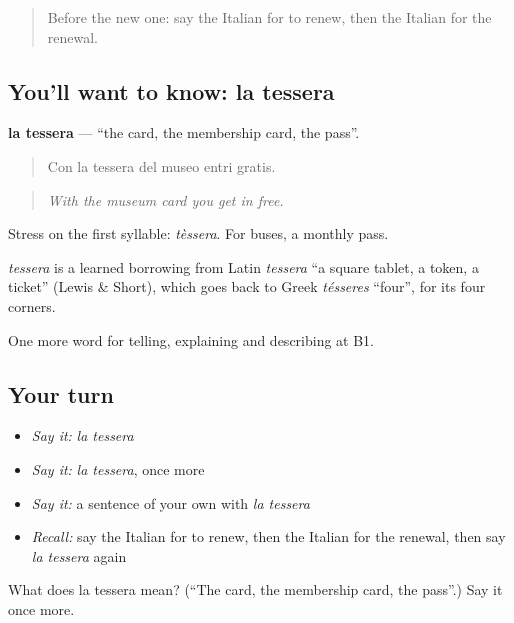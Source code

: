 \label{lesson:IT-C388-tessera}



\begin{quote}
Before the new one: say the Italian for to renew, then the Italian for the renewal.
\end{quote}

\subsection*{You'll want to know: la tessera}
\textbf{la tessera} — \textquotedblleft{}the card, the membership card, the pass\textquotedblright{}.

\begin{quote}
Con la tessera del museo entri gratis.
\end{quote}

\begin{quote}
\emph{With the museum card you get in free.}
\end{quote}

Stress on the first syllable: \emph{tèssera}. For buses, a monthly pass.

\begin{cousinweb}
\emph{tessera} is a learned borrowing from Latin \emph{tessera} \textquotedblleft{}a square tablet, a token, a ticket\textquotedblright{} (Lewis \& Short), which goes back to Greek \emph{tésseres} \textquotedblleft{}four\textquotedblright{}, for its four corners.
\end{cousinweb}

\begin{grammarlens}[title={What you've built}]
One more word for telling, explaining and describing at B1.
\end{grammarlens}

\subsection*{Your turn}
\begin{itemize}
\raggedright
  \item \emph{Say it:} \emph{la tessera}
  \item \emph{Say it:} \emph{la tessera}, once more
  \item \emph{Say it:} a sentence of your own with \emph{la tessera}
  \item \emph{Recall:} say the Italian for to renew, then the Italian for the renewal, then say \emph{la tessera} again
\end{itemize}

\begin{tcolorbox}[breakable,colback=teal!4,colframe=teal!35!black,title={Before you move on}]
What does la tessera mean? (\textquotedblleft{}The card, the membership card, the pass\textquotedblright{}.) Say it once more.
\end{tcolorbox}
